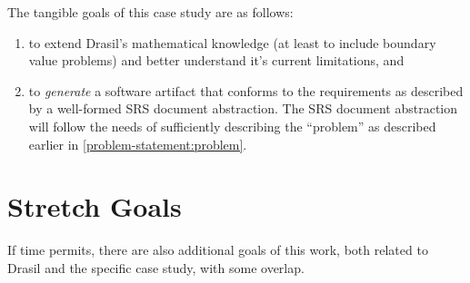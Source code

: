 \documentclass{article}
\begin{document}
The tangible goals of this case study are as follows:

\begin{enumerate}
    \item to extend Drasil's mathematical knowledge (at least to include
          boundary value problems) and better understand it's current
          limitations, and
    \item to \textit{generate} a software artifact that conforms to the
          requirements as described by a well-formed SRS document abstraction.
          The SRS document abstraction will follow the needs of sufficiently
          describing the ``problem'' as described earlier in
          \autoref{problem-statement:problem}.
\end{enumerate}

\section{Stretch Goals}
\label{stretch-goals}

If time permits, there are also additional goals of this work, both related to
Drasil and the specific case study, with some overlap.
\end{document}
